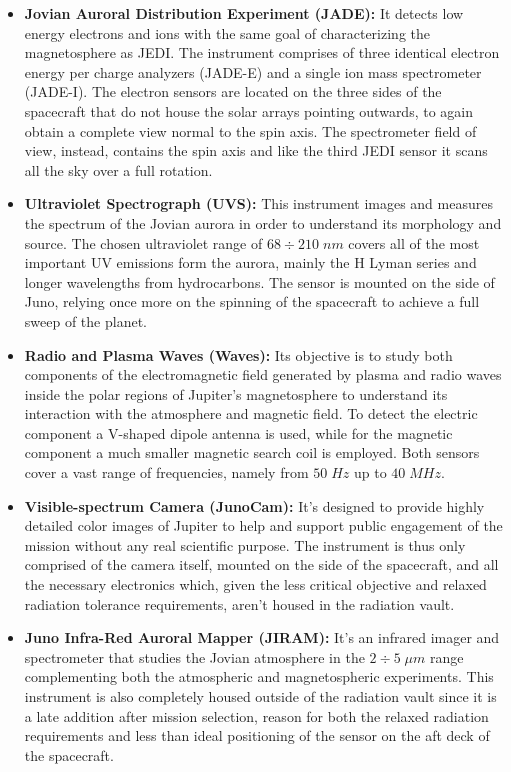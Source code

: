 \begin{itemize}
    \item \textbf{Jovian Auroral Distribution Experiment (JADE):} It detects low energy electrons and ions with the same goal of characterizing the magnetosphere as JEDI. The instrument comprises of three identical electron energy per charge analyzers (JADE-E) and a single ion mass spectrometer (JADE-I). The electron sensors are located on the three sides of the  spacecraft that do not house the solar arrays pointing outwards, to again obtain a complete view normal to the spin axis. The spectrometer field of view, instead, contains the spin axis and like the third JEDI sensor it scans all the sky over a full rotation.
    
    \item \textbf{Ultraviolet Spectrograph (UVS):} This instrument images and measures the spectrum of the Jovian aurora in order to understand its morphology and source. The chosen ultraviolet range of $68 \div 210 \;nm$ covers all of the most important UV emissions form the aurora, mainly the H Lyman series and longer wavelengths from hydrocarbons. The sensor is mounted on the side of Juno, relying once more on the spinning of the spacecraft to achieve a full sweep of the planet. 
    
    \item \textbf{Radio and Plasma Waves (Waves):} Its objective is to study both components of the electromagnetic field generated by plasma and radio waves inside the polar regions of Jupiter's magnetosphere to understand its interaction with the atmosphere and magnetic field. To detect the electric component a V-shaped dipole antenna is used, while for the magnetic component a much smaller magnetic search coil is employed. Both sensors cover a vast range of frequencies, namely from $50 \;Hz$ up to $40 \;MHz$.

    \item \textbf{Visible-spectrum Camera (JunoCam):} It's designed to provide highly detailed color images of Jupiter to help and support public engagement of the mission without any real scientific purpose. The instrument is thus only comprised of the camera itself, mounted on the side of the spacecraft, and all the necessary electronics which, given the less critical objective and relaxed radiation tolerance requirements, aren't housed in the radiation vault.

    \item \textbf{Juno Infra-Red Auroral Mapper (JIRAM):} It's an infrared imager and spectrometer that studies the Jovian atmosphere in the \(2 \div 5 \;\mu m\) range complementing both the atmospheric and magnetospheric experiments. This instrument is also completely housed outside of the radiation vault since it is a late addition after mission selection, reason for both the relaxed radiation requirements and less than ideal positioning of the sensor on the aft deck of the spacecraft.
       
\end{itemize}

